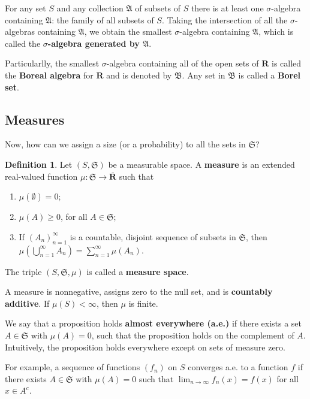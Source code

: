 \documentclass[12pt,a4paper]{article}
\theoremstyle{definition}
\newtheorem{definition}{Definition}[section]
\begin{document}
For any set $S$ and any collection $\mathfrak{A}$ of subsets of $S$ there is at least one $\sigma$-algebra containing $\mathfrak{A}$: the family of all subsets of $S$. Taking the intersection of all the $\sigma$-algebras containing $\mathfrak{A}$, we obtain the smallest $\sigma$-algebra containing $\mathfrak{A}$, which is called the \textbf{$\sigma$-algebra generated by $\mathfrak{A}$}.

Particularlly, the smallest $\sigma$-algebra containing all of the open sets of $\textbf{R}$ is called the \textbf{Boreal algebra} for $\textbf{R}$ and is denoted by $\mathfrak{B}$. Any set in $\mathfrak{B}$ is called a \textbf{Borel set}.

\subsection{Measures}

Now, how can we assign a size (or a probability) to all the sets in $\mathfrak{S}$?

\begin{definition}
	Let $(S, \mathfrak{S})$ be a measurable space. A \textbf{measure} is an extended real-valued function $\mu : \mathfrak{S} \longrightarrow \overline{\textbf{R}}$ such that 
	\begin{enumerate}
		\item $\mu ( \emptyset ) = 0$;
		\item $\mu(A) \geq 0$, for all $A \in \mathfrak{S}$;
		\item If $(A_n)_{n=1}^\infty$ is a countable, disjoint sequence of subsets in $\mathfrak{S}$, then $\mu(\bigcup_{n=1}^\infty A_n) = \sum_{n=1}^\infty \mu(A_n)$.
	\end{enumerate}

	The triple $(S, \mathfrak{S}, \mu)$ is called a \textbf{measure space}.
\end{definition}

A measure is nonnegative, assigns zero to the null set, and is \textbf{countably additive}. If $\mu(S) < \infty$, then $\mu$ is finite.

We say that a proposition holds \textbf{almost everywhere (a.e.)} if there exists a set $A \in \mathfrak{S}$ with $\mu(A) = 0$, such that the proposition holds on the complement of $A$. Intuitively, the proposition holds everywhere except on sets of measure zero.

For example, a sequence of functions $(f_n)$ on $S$ converges a.e. to a function $f$ if there exists $A \in \mathfrak{S}$ with $\mu(A) = 0$ such that $\lim_{n \to \infty} f_n(x) = f(x)$ for all $x \in A^c$.
\end{document}
